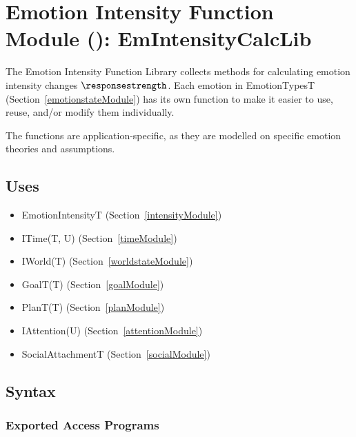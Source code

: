 \section{Emotion Intensity Function Module ():
EmIntensityCalcLib}\label{intensityFunModule}
The Emotion Intensity Function Library collects methods for calculating emotion
intensity changes $\responsestrength$. Each emotion in EmotionTypesT
(Section~\ref{emotionstateModule}) has its own function to make it easier to
use, reuse, and/or modify them individually.

The functions are application-specific, as they are modelled on specific
emotion theories and \progname{} assumptions.

\subsection{Uses}
\begin{itemize}[noitemsep, nosep]

    \item EmotionIntensityT (Section~\ref{intensityModule})

    \item ITime(T, U) (Section~\ref{timeModule})

    \item IWorld(T) (Section~\ref{worldstateModule})

    \item GoalT(T) (Section~\ref{goalModule})

    \item PlanT(T) (Section~\ref{planModule})

    \item IAttention(U) (Section~\ref{attentionModule})

    \item SocialAttachmentT (Section~\ref{socialModule})

\end{itemize}

\subsection{Syntax}

\subsubsection{Exported Access Programs}

